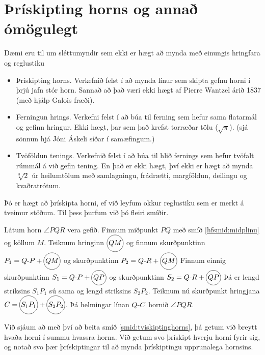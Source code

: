 \section{Þrískipting horns og annað ómögulegt} 
\begin{frame}
  Dæmi eru til um sléttumyndir sem ekki er hægt að mynda með einungis hringfara og reglustiku
\begin{itemize}
\item Þrískipting horns.
  Verkefnið felst í að mynda línur sem skipta gefnu horni í þrjú jafn stór horn.
  Sannað að það væri ekki hægt af Pierre Wantzel árið 1837 (með hjálp Galois fræði).
\item Ferningun hrings. Verkefni felst í að búa til ferning sem hefur sama flatarmál og 
gefinn hringur. Ekki hægt, þar sem það krefst torræðar tölu (\(\sqrt{\pi}\)). (sjá sönnun hjá Jóni Áskeli síðar í samæfingum.)
\item Tvöföldun tenings. Verkefnið felst í að búa til hlið fernings sem hefur tvöfalt rúmmál á við gefin tening.
  En það er ekki hægt, því ekki er hægt að mynda \(\sqrt[3]{2}\) úr heilumtölum með
samlagningu, frádrætti, margföldun, deilingu og kvaðratrótum.
\end{itemize}
\end{frame}

\begin{frame}
  Þó er hægt að þrískipta horni, ef við leyfum okkur reglustiku sem er merkt
  á tveimur stöðum. Til þess þurfum við þó fleiri smíðir.
\end{frame}

\begin{frame}
  \begin{smid}
    \label{smid:tviskiptinghorns}
    Látum horn \(\angle PQR\) vera gefið.
    Finnum miðpunkt \(PQ\) með smíð \ref{hfsmid:midplinu}
    og köllum \(M\).
    Teiknum hringinn \(\hri{QM}\) og finnum skurðpunktinn
    \(P_1 = \lin{Q}{P}+\hri{QM}\)  og skurðpunktinn \(P_2 = \lin{Q}{R}+\hri{QM}\)
    Finnum einnig  skurðpunktinn
    \(S_1 = \lin{Q}{P}+\hri{QP}\)  og skurðpunktinn \(S_2 = \lin{Q}{R}+\hri{QP}\)
    Þá er lengd striksins \(S_1P_1\) sú sama og lengd striksins
    \(S_2P_2\).
    Teiknum nú skurðpunkt hringjana
    \(C = \hri{S_1P_1}+\hri{S_2P_2}\).
    Þá helmingar línan \(\lin{Q}{C}\) hornið \(\angle PQR\).
  \end{smid}
\end{frame}

\begin{frame}
  Við sjáum að með því að beita smíð \ref{smid:tviskiptinghorns}, þá getum við
  breytt hvaða horni í summu hvassra horna. Við getum svo þrískipt hverju horni fyrir
  sig, og notað svo þær þrískiptingar til að mynda þrískiptingu upprunalega hornsins.
\end{frame}

